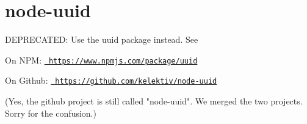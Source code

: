 \chapter{node-\/uuid}
\hypertarget{md__c_1_2_users_2_s_t_r_i_d_e_r_2source_2repos_2_internal_a_p_i_2_internal_a_p_i_2wwwroot_2lib_27b50aae5ecf3432dca92dc772f0915ea}{}\label{md__c_1_2_users_2_s_t_r_i_d_e_r_2source_2repos_2_internal_a_p_i_2_internal_a_p_i_2wwwroot_2lib_27b50aae5ecf3432dca92dc772f0915ea}
\label{md__c_1_2_users_2_s_t_r_i_d_e_r_2source_2repos_2_internal_a_p_i_2_internal_a_p_i_2wwwroot_2lib_27b50aae5ecf3432dca92dc772f0915ea_autotoc_md3832}%
%
 DEPRECATED\+: Use the {\ttfamily uuid} package instead. See


\begin{DoxyItemize}
\item On NPM\+: \href{https://www.npmjs.com/package/uuid}{\texttt{ https\+://www.\+npmjs.\+com/package/uuid}}
\item On Github\+: \href{https://github.com/kelektiv/node-uuid}{\texttt{ https\+://github.\+com/kelektiv/node-\/uuid}}
\end{DoxyItemize}

(Yes, the github project is still called "{}node-\/uuid"{}. We merged the two projects. Sorry for the confusion.) 